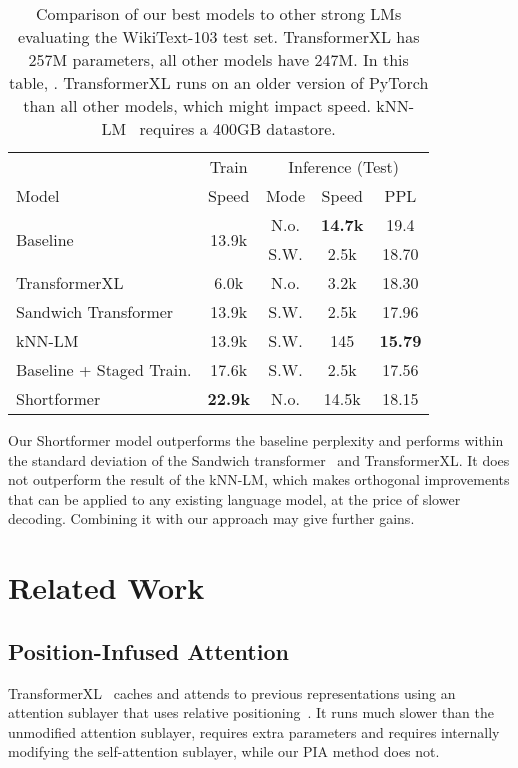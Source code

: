 \documentclass[11pt,a4paper]{article}
\begin{document}
\begin{table}[h]
\centering
\small
\setlength{\tabcolsep}{3pt}
\begin{tabular}{@{}lcccc@{}} \toprule
&Train& \multicolumn{3}{c}{Inference (Test)} \\  \cmidrule(lr){2-2}\cmidrule(lr){3-5}
Model   & Speed & Mode & Speed   & PPL   \\ \midrule
\multirow{2}{*}{Baseline}& \multirow{2}{*}{13.9k} & N.o. & \textbf{14.7k}& 19.4 \\
&&S.W.&2.5k&18.70\\
TransformerXL & 6.0k & N.o.& 3.2k & 18.30 \\
Sandwich Transformer      & 13.9k&S.W. &2.5k & 17.96 \\
kNN-LM        & 13.9k&S.W. & 145 & \textbf{15.79} \\ \midrule
Baseline + Staged Train. &17.6k&S.W.&2.5k &17.56 \\
Shortformer   & \textbf{22.9k}& N.o.& 14.5k& 18.15    \\ \bottomrule


\end{tabular} \caption{\label{tab:combined_test} Comparison of our best models to other strong LMs evaluating the WikiText-103 test set. TransformerXL has 257M parameters, all other models have 247M. In this table, .  TransformerXL runs on an older version of PyTorch than all other models, which might impact  speed. kNN-LM~\citep{khandelwal20generalization} requires a 400GB datastore. }
\end{table}



Our Shortformer model outperforms the baseline perplexity and performs within the standard deviation of the Sandwich transformer~\cite{sandwich} and TransformerXL. It does not outperform the result of the kNN-LM, which makes orthogonal improvements that can be applied to any existing language model, at the price of slower decoding. Combining it with our approach may give further gains.  \section{Related Work}
\subsection{Position-Infused Attention}
TransformerXL~\cite{transformer-xl} caches and attends to previous representations using an attention sublayer that uses relative positioning~\cite{shaw}. It runs much slower than the unmodified attention sublayer, requires extra parameters and requires internally modifying the self-attention sublayer, while our PIA method does not. 
\end{document}
